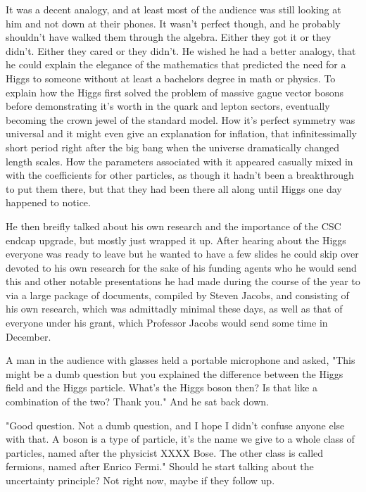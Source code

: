 It was a decent analogy, and at least most of the audience was still looking at him and not down at their phones. It wasn't perfect though, and he probably shouldn't have walked them through the algebra. Either they got it or they didn't. Either they cared or they didn't. He wished he had a better analogy, that he could explain the elegance of the mathematics that predicted the need for a Higgs to someone without at least a bachelors degree in math or physics. To explain how the Higgs first solved the problem of massive gague vector bosons before demonstrating it's worth in the quark and lepton sectors, eventually becoming the crown jewel of the standard model. How it's perfect symmetry was universal and it might even give an explanation for inflation, that infinitessimally short period right after the big bang when the universe dramatically changed length scales. How the parameters associated with it appeared casually mixed in with the coefficients for other particles, as though it hadn't been a breakthrough to put them there, but that they had been there all along until Higgs one day happened to notice. 

He then breifly talked about his own research and the importance of the CSC endcap upgrade, but mostly just wrapped it up. After hearing about the Higgs everyone was ready to leave but he wanted to have a few slides he could skip over devoted to his own research for the sake of his funding agents who he would send this and other notable presentations he had made during the course of the year to via a large package of documents, compiled by Steven Jacobs, and consisting of his own research, which was admittadly minimal these days, as well as that of everyone under his grant, which Professor Jacobs would send some time in December. 

\mypause

A man in the audience with glasses held a portable microphone and asked, "This might be a dumb question but you explained the difference between the Higgs field and the Higgs particle. What's the Higgs boson then? Is that like a combination of the two? Thank you." And he sat back down.

"Good question. Not a dumb question, and I hope I didn't confuse anyone else with that. A boson is a type of particle, it's the name we give to a whole class of particles, named after the physicist XXXX Bose. The other class is called fermions, named after Enrico Fermi." Should he start talking about the uncertainty principle? Not right now, maybe if they follow up.

